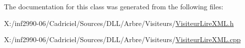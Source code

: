 The documentation for this class was generated from the following files\-:\begin{DoxyCompactItemize}
\item 
X\-:/inf2990-\/06/\-Cadriciel/\-Sources/\-D\-L\-L/\-Arbre/\-Visiteurs/\hyperlink{_visiteur_lire_x_m_l_8h}{Visiteur\-Lire\-X\-M\-L.\-h}\item 
X\-:/inf2990-\/06/\-Cadriciel/\-Sources/\-D\-L\-L/\-Arbre/\-Visiteurs/\hyperlink{_visiteur_lire_x_m_l_8cpp}{Visiteur\-Lire\-X\-M\-L.\-cpp}\end{DoxyCompactItemize}
